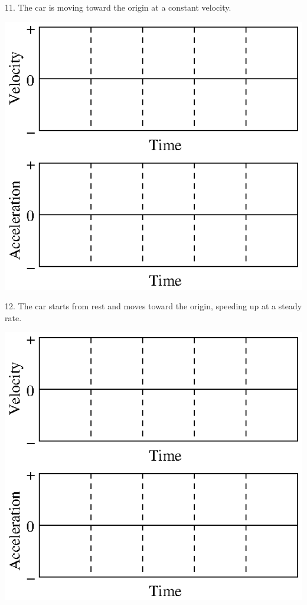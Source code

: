 11. The car is moving toward the origin at a constant velocity.

\vspace{0.3cm}
{\par\centering \includegraphics{slowing/slowing_fig15.eps} \par}
\vspace{1.3cm}

12. The car starts from rest and moves toward the origin, speeding up at a steady
rate.

\vspace{0.3cm}
{\par\centering \includegraphics{slowing/slowing_fig15.eps} \par}
\vspace{1.3cm}

